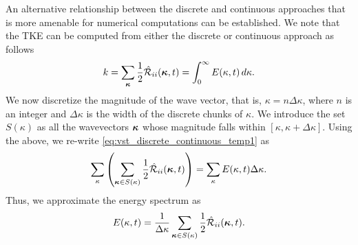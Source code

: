 \documentclass[oneside,a4paper,11pt]{report}
\newcommand{\tpvc}{\mathcal{R}} %
\newcommand{\est}{E}            %
\begin{document}
An alternative relationship between the discrete and continuous approaches that is more amenable for numerical computations can be established. We note that the TKE can be computed from either the discrete or continuous approach as follows
\begin{equation}
    \label{eq:vst_discrete_continuous_temp1}
    k = \sum_{\kvec} \frac{1}{2} \hat{\tpvc}_{ii}(\kvec,t) = \int_0^\infty \est(\kappa,t) \, d\kappa.
\end{equation}
We now discretize the magnitude of the wave vector, that is, $\kappa = n \Delta \kappa$, where $n$ is an integer and $\Delta \kappa$ is the width of the discrete chunks of $\kappa$. We introduce the set $S(\kappa)$ as all the wavevectors $\boldsymbol\kappa$ whose magnitude falls within $[\kappa, \kappa + \Delta \kappa]$. Using the above, we re-write \cref{eq:vst_discrete_continuous_temp1} as
\begin{equation}
    \sum_{\kappa} \left ( \sum_{\kvec \in S(\kappa)} \frac{1}{2} \hat{\tpvc}_{ii}(\kvec,t) \right) = \sum_{\kappa} \est(\kappa,t) \Delta \kappa.
\end{equation}
Thus, we approximate the energy spectrum as
\begin{equation}
    \label{eq:num_comp_spectra}
    E(\kappa,t) = \frac{1}{\Delta \kappa} \sum_{\kvec \in S(\kappa)} \frac{1}{2} \hat{\tpvc}_{ii}(\kvec,t) .
\end{equation}


\end{document}
